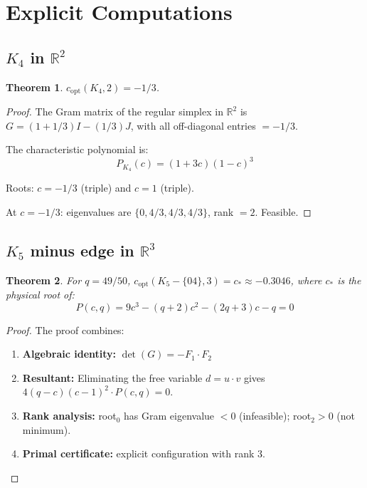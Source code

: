 \documentclass[11pt]{article}
\newtheorem{theorem}{Theorem}[section]
\theoremstyle{definition}
\begin{document}
\section{Explicit Computations}

\subsection{$K_4$ in $\mathbb{R}^2$}

\begin{theorem}
$c_{\mathrm{opt}}(K_4, 2) = -1/3$.
\end{theorem}

\begin{proof}
The Gram matrix of the regular simplex in $\mathbb{R}^2$ is
$G = (1+1/3)I - (1/3)J$, with all off-diagonal entries $= -1/3$.

The characteristic polynomial is:
\begin{equation}
P_{K_4}(c) = (1+3c)(1-c)^3
\end{equation}

Roots: $c = -1/3$ (triple) and $c = 1$ (triple).

At $c = -1/3$: eigenvalues are $\{0, 4/3, 4/3, 4/3\}$, rank $= 2$.
Feasible.
\end{proof}

\subsection{$K_5$ minus edge in $\mathbb{R}^3$}

\begin{theorem}\label{thm:k5m}
For $q = 49/50$, $c_{\mathrm{opt}}(K_5 - \{04\}, 3) = c_* \approx -0.3046$,
where $c_*$ is the physical root of:
\begin{equation}
P(c,q) = 9c^3 - (q+2)c^2 - (2q+3)c - q = 0
\end{equation}
\end{theorem}

\begin{proof}
The proof combines:
\begin{enumerate}
    \item \textbf{Algebraic identity:} $\det(G) = -F_1 \cdot F_2$
    \item \textbf{Resultant:} Eliminating the free variable $d = u \cdot v$
    gives $4(q-c)(c-1)^2 \cdot P(c,q) = 0$.
    \item \textbf{Rank analysis:} root$_0$ has Gram eigenvalue $< 0$ (infeasible);
    root$_2 > 0$ (not minimum).
    \item \textbf{Primal certificate:} explicit configuration with rank 3.
\end{enumerate}
\end{proof}
\end{document}
